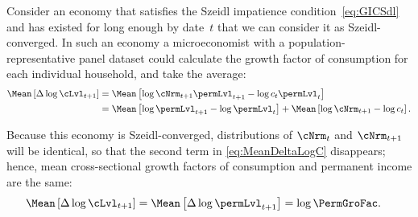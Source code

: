 \documentclass[BufferStockTheory]{subfiles}
\begin{document}
Consider an economy that satisfies the Szeidl impatience condition~\eqref{eq:GICSdl} and has existed for long enough by date~$t$ that we can consider it as Szeidl-converged.
In such an economy a microeconomist with a population-representative panel dataset could calculate the growth factor of consumption for each individual household, and take the average:
\begin{equation}\label{eq:MeanDeltaLogC}
  \begin{split}
    \Mean\left[\Delta \log \cLvl_{t+1}\right]  & = \Mean\left[ \log {\cNrm}_{t+1}\permLvl_{t+1} - \log c_{t}\permLvl_{t}\right]  \\
    & = \Mean\left[ \log \permLvl_{t+1}- \log \permLvl_{t}\right] + \Mean\left[ \log {\cNrm}_{t+1} - \log c_{t}\right].
  \end{split}
\end{equation}

Because this economy is Szeidl-converged, distributions of $\cNrm_{t}$ and $\cNrm_{t+1}$ will be identical, so that the second term in  \eqref{eq:MeanDeltaLogC} disappears; hence, mean cross-sectional growth factors of consumption and permanent income are the same:
\begin{align}
  \Mean\left[\Delta \log \cLvl_{t+1}\right]  & = \Mean\left[ \Delta \log \permLvl_{t+1}\right] = \log \PermGroFac \label{eq:MeanDeltaLogCeqMeanDeltaLogP}.
\end{align}
\end{document}

